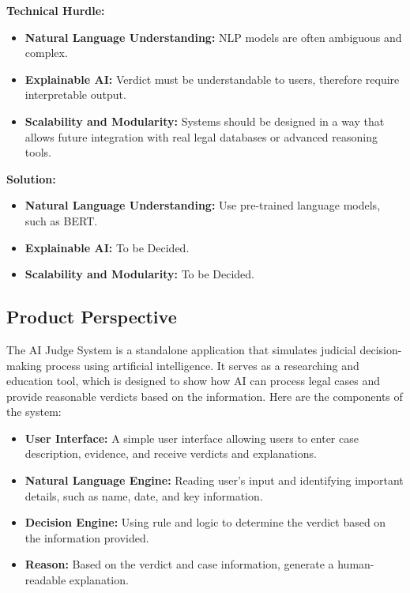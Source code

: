 \documentclass[12pt]{article}
\begin{document}
\textbf{Technical Hurdle:}
\begin{itemize}
    \item \textbf{Natural Language Understanding:} NLP models are often ambiguous and complex.
    \item \textbf{Explainable AI:} Verdict must be understandable to users, therefore require interpretable output.
    \item \textbf{Scalability and Modularity:} Systems should be designed in a way that allows future integration with real legal databases or advanced reasoning tools.
\end{itemize}

\textbf{Solution:}
\begin{itemize}
    \item \textbf{Natural Language Understanding:} Use pre-trained language models, such as BERT.
    \item \textbf{Explainable AI:} To be Decided.
    \item \textbf{Scalability and Modularity:} To be Decided.
\end{itemize}

\subsection{Product Perspective}

The AI Judge System is a standalone application that simulates judicial decision-making process using artificial intelligence. It serves as a researching and education tool, which is designed to show how AI can process legal cases and provide reasonable verdicts based on the information. Here are the components of the system:

\begin{itemize}
    \item \textbf{User Interface:} A simple user interface allowing users to enter case description, evidence, and receive verdicts and explanations.
\end{itemize}

\begin{itemize}
    \item \textbf{Natural Language Engine:} Reading user's input and identifying important details, such as name, date, and key information.
    \item \textbf{Decision Engine:} Using rule and logic to determine the verdict based on the information provided.
    \item \textbf{Reason:} Based on the verdict and case information, generate a human-readable explanation.
\end{itemize}
\end{document}
